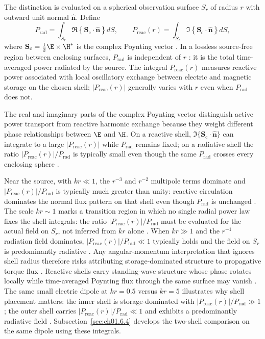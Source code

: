 The distinction is evaluated on a spherical observation surface $S_r$ of radius $r$ with outward unit normal $\hat{\mathbf{n}}$. Define
\begin{equation}
\label{eq:ch1.ex64-power-functionals}
P_{\mathrm{rad}}=\int_{S_r}\Re\!\left\{\mathbf{S}_\mathrm{c}\cdot\hat{\mathbf{n}}\right\}dS,\qquad
P_{\mathrm{reac}}(r)=\int_{S_r}\Im\!\left\{\mathbf{S}_\mathrm{c}\cdot\hat{\mathbf{n}}\right\}dS,
\end{equation}
where \(\mathbf{S}_\mathrm{c}=\tfrac{1}{2}\E\times\H^*\) is the complex Poynting vector
\cite{poynting1884}. In a lossless source-free region between enclosing surfaces, $P_{\mathrm{rad}}$ is independent of $r$ \cite{stratton1941}: it is the total time-averaged power radiated by the source. The integral $P_{\mathrm{reac}}(r)$ measures reactive power associated with local oscillatory exchange between electric and magnetic storage on the chosen shell; $|P_{\mathrm{reac}}(r)|$ generally varies with $r$ even when $P_{\mathrm{rad}}$ does not.

The real and imaginary parts of the complex Poynting vector distinguish active power transport from reactive harmonic exchange because they weight different phase relationships between \(\E\) and \(\H\). On a reactive shell, \(\Im\{\mathbf{S}_\mathrm{c}\cdot\hat{\mathbf{n}}\}\) can integrate to a large \(|P_{\mathrm{reac}}(r)|\) while \(P_{\mathrm{rad}}\) remains fixed; on a radiative shell the ratio \(|P_{\mathrm{reac}}(r)|/P_{\mathrm{rad}}\) is typically small even though the same $P_{\mathrm{rad}}$ crosses every enclosing sphere \cite{poynting1884,stratton1941}.

Near the source, with \(kr\ll 1\), the \(r^{-3}\) and \(r^{-2}\) multipole terms dominate and \(|P_{\mathrm{reac}}(r)|/P_{\mathrm{rad}}\) is typically much greater than unity: reactive circulation dominates the normal flux pattern on that shell even though \(P_{\mathrm{rad}}\) is unchanged \cite{stratton1941}. The scale \(kr\sim 1\) marks a transition region in which no single radial power law fixes the shell integrals: the ratio \(|P_{\mathrm{reac}}(r)|/P_{\mathrm{rad}}\) must be evaluated for the actual field on \(S_r\), not inferred from \(kr\) alone \cite{stratton1941}. When \(kr\gg 1\) and the \(r^{-1}\) radiation field dominates, \(|P_{\mathrm{reac}}(r)|/P_{\mathrm{rad}}\ll 1\) typically holds and the field on \(S_r\) is predominantly radiative \cite{poynting1884,stratton1941}. Any angular-momentum interpretation that ignores shell radius therefore risks
attributing storage-dominated structure to propagative torque flux
\cite{stratton1941}. Reactive shells carry standing-wave structure whose phase rotates
locally while time-averaged Poynting flux through the same surface may vanish
\cite{stratton1941}. The same small electric dipole at $kr=0.5$ versus $kr=5$ illustrates why
shell placement matters: the inner shell is storage-dominated with \(|P_{\mathrm{reac}}(r)|/P_{\mathrm{rad}}\gg 1\); the outer shell carries \(|P_{\mathrm{reac}}(r)|/P_{\mathrm{rad}}\ll 1\) and exhibits a predominantly radiative field \cite{harrington2001}. Subsection~\ref{sec:ch01.6.4} develops the two-shell comparison on the same dipole using these integrals.

